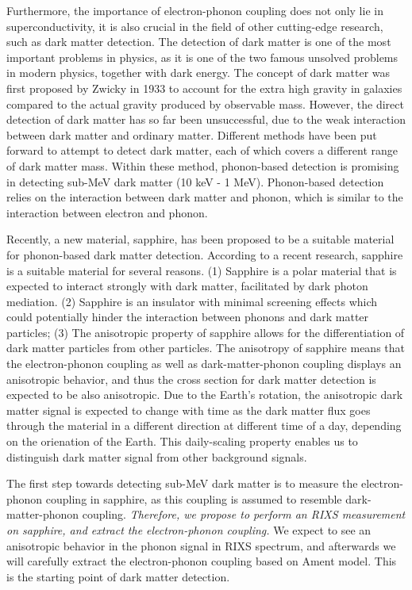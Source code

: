 \documentclass[11pt]{article}
\begin{document}
Furthermore, the importance of electron-phonon coupling does not only lie in superconductivity, it is also crucial in the field of other cutting-edge research, such as dark matter detection. The detection of dark matter is one of the most important problems in physics, as it is one of the two famous unsolved problems in modern physics, together with dark energy. The concept of dark matter was first proposed by Zwicky in 1933 to account for the extra high gravity in galaxies compared to the actual gravity produced by observable mass. However, the direct detection of dark matter has so far been unsuccessful, due to the weak interaction between dark matter and ordinary matter. Different methods have been put forward to attempt to detect dark matter\cite{}, each of which covers a different range of dark matter mass. Within these method, phonon-based detection is promising in detecting sub-MeV dark matter (10 keV - 1 MeV)\cite{}. Phonon-based detection relies on the interaction between dark matter and phonon, which is similar to the interaction between electron and phonon\cite{}. 

Recently, a new material, sapphire, has been proposed to be a suitable material for phonon-based dark matter detection\cite{}. According to a recent research, sapphire is a suitable material for several reasons. (1) Sapphire is a polar material that is expected to interact strongly with dark matter, facilitated by dark photon mediation. (2) Sapphire is an insulator with minimal screening effects which could potentially hinder the interaction between phonons and dark matter particles; (3)  The anisotropic property of sapphire allows for the differentiation of dark matter particles from other particles. The anisotropy of sapphire means that the electron-phonon coupling as well as dark-matter-phonon coupling displays an anisotropic behavior\cite{}, and thus the cross section for dark matter detection is expected to be also anisotropic. Due to the Earth's rotation, the anisotropic dark matter signal is expected to change with time as the dark matter flux goes through the material in a different direction at different time of a day, depending on the orienation of the Earth. This daily-scaling property enables us to distinguish dark matter signal from other background signals. 

The first step towards detecting sub-MeV dark matter is to measure the electron-phonon coupling in sapphire, as this coupling is assumed to resemble dark-matter-phonon coupling. \textit{Therefore, we propose to perform an RIXS measurement on sapphire, and extract the electron-phonon coupling.}  We expect to see an anisotropic behavior in the phonon signal in RIXS spectrum, and afterwards we will carefully extract the electron-phonon coupling based on Ament model\cite{ament_determining_2011}. This is the starting point of dark matter detection.
\end{document}
